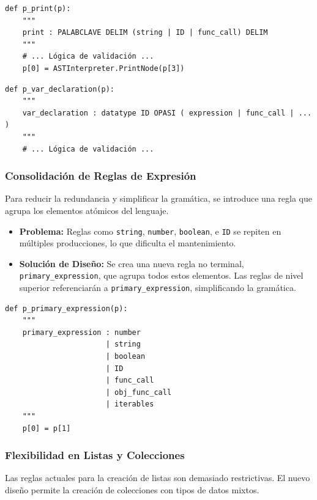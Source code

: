 \documentclass{article}
\begin{document}
\begin{lstlisting}[style=mypython, caption={Modificación de la regla \texttt{p\_print} para aceptar llamadas a función.}]
def p_print(p):
    """
    print : PALABCLAVE DELIM (string | ID | func_call) DELIM
    """
    # ... Lógica de validación ...
    p[0] = ASTInterpreter.PrintNode(p[3])
\end{lstlisting}

\begin{lstlisting}[style=mypython, caption={Expansión de la regla \texttt{p\_var\_declaration} para inicializar con el retorno de una función.}]
def p_var_declaration(p):
    """
    var_declaration : datatype ID OPASI ( expression | func_call | ... )
    """
    # ... Lógica de validación ...
\end{lstlisting}


\subsubsection{Consolidación de Reglas de Expresión}
Para reducir la redundancia y simplificar la gramática, se introduce una regla que agrupa los elementos atómicos del lenguaje.

\begin{itemize}
    \item \textbf{Problema:} Reglas como \texttt{string}, \texttt{number}, \texttt{boolean}, e \texttt{ID} se repiten en múltiples producciones, lo que dificulta el mantenimiento.
    
    \item \textbf{Solución de Diseño:} Se crea una nueva regla no terminal, \texttt{primary\_expression}, que agrupa todos estos elementos. Las reglas de nivel superior referenciarán a \texttt{primary\_expression}, simplificando la gramática.
\end{itemize}

\begin{lstlisting}[style=mypython, caption={Definición de la regla de consolidación \texttt{primary\_expression}.}]
def p_primary_expression(p):
    """
    primary_expression : number
                       | string
                       | boolean
                       | ID
                       | func_call
                       | obj_func_call
                       | iterables
    """
    p[0] = p[1]
\end{lstlisting}


\subsubsection{Flexibilidad en Listas y Colecciones}
Las reglas actuales para la creación de listas son demasiado restrictivas. El nuevo diseño permite la creación de colecciones con tipos de datos mixtos.
\end{document}
